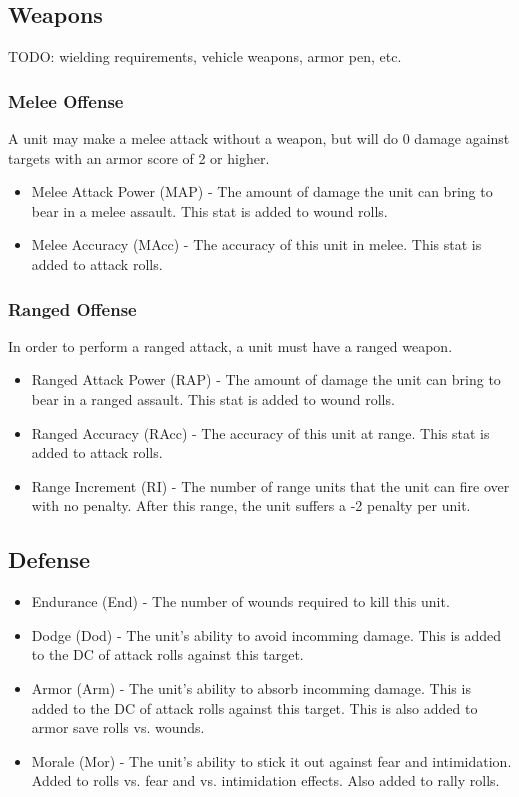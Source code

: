 \documentclass{article}
\begin{document}
\subsection{Weapons}
TODO: wielding requirements, vehicle weapons, armor pen, etc.
\subsubsection{Melee Offense}
A unit may make a melee attack without a weapon, but will do 0 damage against targets with an armor score of 2 or higher.
\begin{itemize}
	\item Melee Attack Power (MAP) - The amount of damage the unit can bring to bear in a melee assault.  This stat is added to wound rolls.
	\item Melee Accuracy (MAcc) - The accuracy of this unit in melee. This stat is added to attack rolls.
\end{itemize}

\subsubsection{Ranged Offense}
In order to perform a ranged attack, a unit must have a ranged weapon.
\begin{itemize}
	\item Ranged Attack Power (RAP) - The amount of damage the unit can bring to bear in a ranged assault.  This stat is added to wound rolls.
	\item Ranged Accuracy (RAcc) - The accuracy of this unit at range. This stat is added to attack rolls.
	\item Range Increment (RI) - The number of range units that the unit can fire over with no penalty.  After this range, the unit suffers a -2 penalty per unit.
\end{itemize}

\subsection{Defense}
\begin{itemize}
	\item Endurance (End) - The number of wounds required to kill this unit.
	\item Dodge (Dod) - The unit's ability to avoid incomming damage. This is added to the DC of attack rolls against this target.
	\item Armor (Arm) - The unit's ability to absorb incomming damage. This is added to the DC of attack rolls against this target. This is also added to armor save rolls vs. wounds.
	\item Morale (Mor) - The unit's ability to stick it out against fear and intimidation.  Added to rolls vs. fear and vs. intimidation effects. Also added to rally rolls.
\end{itemize}
\end{document}
